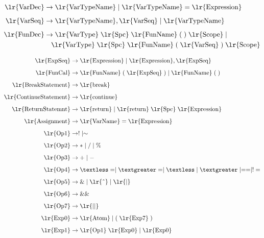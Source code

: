 \documentclass[a4paper,12pt]{article}
\begin{document}
\begin{align*}
\text{\lr{VarDec}} &\rightarrow \text{\lr{VarTypeName}} \mid \text{\lr{VarTypeName}} = \text{\lr{Expression}} \\[0.5em]
\text{\lr{VarSeq}} &\rightarrow \text{\lr{VarTypeName}} , \text{\lr{VarSeq}} \mid \text{\lr{VarTypeName}} \\[0.5em]
\text{\lr{FunDec}} &\rightarrow \text{\lr{VarType}} \; \text{\lr{Spc}} \; \text{\lr{FunName}} \; ( \; ) \; \text{\lr{Scope}} \mid \\
&\quad \text{\lr{VarType}} \; \text{\lr{Spc}} \; \text{\lr{FunName}} \; ( \; \text{\lr{VarSeq}} \; ) \; \text{\lr{Scope}} \\[0.5em]
\end{align*}
\begin{align*}
\text{\lr{ExpSeq}} &\rightarrow \text{\lr{Expression}} \mid \text{\lr{Expression}} , \text{\lr{ExpSeq}} \\[0.5em]
\text{\lr{FunCal}} &\rightarrow \text{\lr{FunName}} \; ( \; \text{\lr{ExpSeq}} \; ) \mid \text{\lr{FunName}} \; ( \; ) \\[0.5em]
\text{\lr{BreakStatement}} &\rightarrow \text{\lr{break}} \\[0.5em]
\text{\lr{ContinueStatement}} &\rightarrow \text{\lr{continue}} \\[0.5em]
\text{\lr{ReturnStatemnt}} &\rightarrow \text{\lr{return}} \mid \text{\lr{return}} \; \text{\lr{Spc}} \; \text{\lr{Expression}} \\[0.5em]
\text{\lr{Assignment}} &\rightarrow \text{\lr{VarName}} = \text{\lr{Expression}} \\[0.5em]
\text{\lr{Op1}} &\rightarrow ! \mid \sim \\[0.5em]
\text{\lr{Op2}} &\rightarrow * \mid / \mid \% \\[0.5em]
\text{\lr{Op3}} &\rightarrow + \mid - \\[0.5em]
\text{\lr{Op4}} &\rightarrow \textless= \mid \textgreater= \mid \textless \mid \textgreater \mid == \mid != \\[0.5em]
\text{\lr{Op5}} &\rightarrow \& \mid \text{\lr{\^{}}} \mid \text{\lr{|}} \\[0.5em]
\text{\lr{Op6}} &\rightarrow \&\& \\[0.5em]
\text{\lr{Op7}} &\rightarrow \text{\lr{||}} \\[0.5em]
\text{\lr{Exp0}} &\rightarrow \text{\lr{Atom}} \mid ( \; \text{\lr{Exp7}} \; ) \\[0.5em]
\text{\lr{Exp1}} &\rightarrow \text{\lr{Op1}} \; \text{\lr{Exp0}} \mid \text{\lr{Exp0}} \\[0.5em]

\end{align*}
\end{document}

